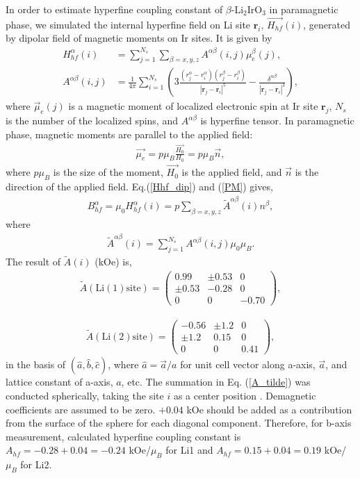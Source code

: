 In order to estimate hyperfine coupling constant of $\beta$-Li$_2$IrO$_3$ in paramagnetic phase,
we simulated the internal hyperfine field on Li site $\bm{r}_i$, $\overrightarrow{H_{hf}}(i)$, generated by dipolar field of magnetic moments on Ir sites.
It is given by
\begin{align}
\label{Hhf_dip}
H^\alpha_{hf}(i) &= \sum^{N_s}_{j = 1}\sum_{\beta = x,y,z}A^{\alpha\beta}(i, j)\mu^\beta_e(j),\\
A^{\alpha\beta} (i, j) &= \frac{1}{4\pi}\sum^{N_s}_{i = 1}\left(3\frac{(r^\alpha_j-r^\alpha_i)(r^\beta_j-r^\beta_i)}{|\bm{r}_j - \bm{r}_i|^5}
  - \frac{\delta^{\alpha\beta}}{|\bm{r}_j - \bm{r}_i|^3}\right),
\end{align}
where $\vec{\mu}_e(j)$ is a magnetic moment of localized electronic spin at Ir site $\bm{r}_j$, $N_s$ is the number of the localized spins, and $A^{\alpha\beta}$ is hyperfine tensor.
In paramagnetic phase, magnetic moments are parallel to the applied field:
\begin{align}
\label{PM}
\vec{\mu_e} = p\mu_B \frac{\vec{H_0}}{H_0}= p\mu_B\vec{n},
\end{align}
where $p\mu_B$ is the size of the moment, $\vec{H_0}$ is the applied field, and $\vec{n}$ is the direction of the applied field.
Eq.(\ref{Hhf_dip}) and (\ref{PM}) gives,
\begin{align}
\label{Bhf_n}
B^\alpha_{hf} = \mu_0 H^\alpha_{hf}(i) = p\sum_{\beta = x,y,z}\tilde{A}^{\alpha\beta}(i)n^\beta,
\end{align}
where
\begin{align}
\label{A_tilde}
\tilde{A}^{\alpha\beta} (i) = \sum^{N_s}_{j = 1} A^{\alpha\beta}(i, j)\mu_0\mu_B.
\end{align}
The result of $\tilde{A}(i)$ (kOe) is,
\begin{align}
\label{Li1}
\tilde{A}(\mathrm{Li(1)site}) =
\begin{pmatrix}
0.99 & \pm0.53 & 0\\
\pm0.53 & -0.28 & 0\\
0 & 0 & -0.70
\end{pmatrix},
\end{align}

\begin{align}
\label{Li2}
\tilde{A}(\mathrm{Li(2)site}) =
\begin{pmatrix}
-0.56 & \pm1.2 & 0\\
\pm1.2 & 0.15 & 0\\
0 & 0 & 0.41
\end{pmatrix},
\end{align}
in the basis of $(\hat{a}, \hat{b}, \hat{c})$, where $\hat{a} = \vec{a}/a$ for unit cell vector along a-axis, $\vec{a}$, and lattice constant of a-axis, $a$, etc.
The summation in Eq. (\ref{A_tilde}) was conducted spherically, taking the site $i$ as a center position \cite{Kanamori}.
Demagnetic coefficients are assumed to be zero.
$+ 0 .04$ kOe should be added as a contribution from the surface of the sphere for each diagonal component.
Therefore, for b-axis measurement, calculated hyperfine coupling constant is $A_{hf} = -0.28 + 0.04 = -0.24$ kOe/$\mu_B$ for Li1 and $A_{hf} = 0.15 + 0.04 = 0.19$ kOe/$\mu_B$ for Li2.

